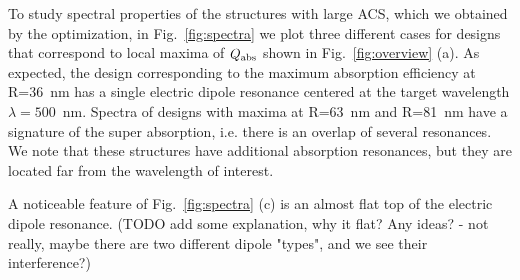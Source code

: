 \documentclass[aps,prl,twocolumn,showpacs,superscriptaddress,groupedaddress]{revtex4-1}
\begin{document}
\begin{figure}
\end{figure}
%
To study spectral properties of the structures with large ACS, which
we obtained by the optimization, in Fig.~\ref{fig:spectra} we plot
three different cases for designs that correspond to local maxima of
$Q_{\rm abs}$ shown in Fig.~\ref{fig:overview} (a).  As expected, the
design corresponding to the maximum absorption efficiency at R=36~nm
has a single electric dipole resonance centered at the target
wavelength $\lambda=500$~nm. Spectra of designs with maxima at R=63~nm
and R=81~nm have a signature of the super absorption, i.e. there is an
overlap of several resonances.  We note that these structures have
additional absorption resonances, but they are located far from the
wavelength of interest.

A noticeable feature of Fig.~\ref{fig:spectra} (c) is an almost flat
top of the electric dipole resonance. (TODO add some explanation, why
it flat? Any ideas?  - not really, maybe there are two different
dipole "types", and we see their interference?)
\end{document}

